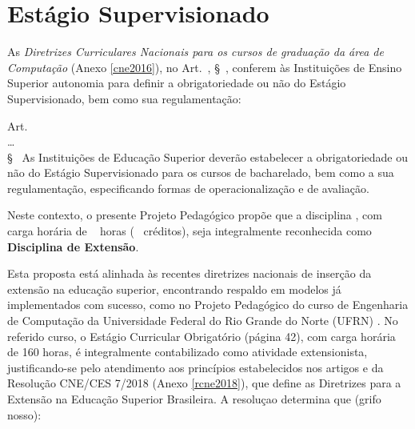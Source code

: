 \section{Estágio Supervisionado}
\label{sec:estagio-supervisionado-extensionista}
As \textit{Diretrizes Curriculares Nacionais para os cursos de graduação da área de Computação} (Anexo \ref{cne2016}), no Art.~, \S~, conferem às Instituições de Ensino Superior autonomia para definir a obrigatoriedade ou não do Estágio Supervisionado, bem como sua regulamentação:

\begin{itquotation}
    \noindent Art.~\\
    \ldots\\
    \S~   As Instituições de Educação Superior deverão estabelecer a
    obrigatoriedade ou não do Estágio Supervisionado para os cursos de bacharelado, bem como a
    sua regulamentação, especificando formas de operacionalização e de avaliação.
\end{itquotation}

Neste contexto, o presente Projeto Pedagógico propõe que a disciplina \textbf{\EstSup}, com carga horária de \EstSupCH~ horas (\EstSupCred~  créditos), seja integralmente reconhecida como \textbf{Disciplina de Extensão}.

Esta proposta está alinhada às recentes diretrizes nacionais de inserção da extensão na educação superior, encontrando respaldo em modelos já implementados com sucesso, como no Projeto Pedagógico do curso de Engenharia de Computação da Universidade Federal do Rio Grande do Norte (UFRN) \cite{ufrn2024}. No referido curso, o Estágio Curricular Obrigatório (página 42), com carga horária de 160 horas, é integralmente contabilizado como atividade extensionista, justificando-se pelo atendimento aos princípios estabelecidos nos artigos  e   da Resolução CNE/CES   7/2018 (Anexo \ref{rcne2018}), que define as Diretrizes para a Extensão na Educação Superior Brasileira. A resoluçao determina que (grifo nosso):



